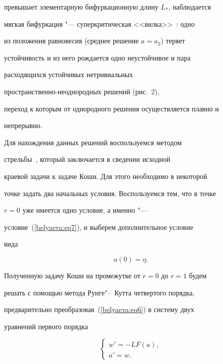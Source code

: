 превышает элементарную бифуркационную длину $L_*$, наблюдается

мягкая бифуркация "--- суперкритическая <<вилка>>~\cite{Bif}: одно

из положения равновесия (среднее решение $a=a_2$) теряет

устойчивость и из него рождается одно неустойчивое и пара

расходящихся устойчивых нетривиальных

про\-стран\-ствен\-но-не\-од\-но\-род\-ных решений (рис.~2),

переход к которым от однородного решения осуществляется плавно и

непрерывно.





Для нахождения данных решений воспользуемся методом

стрельбы~\cite{Hol}, который заключается в сведении исходной

краевой задачи к задаче Коши. Для этого необходимо в некоторой

точке задать два начальных условия. Воспользуемся тем, что в точке

$r=0$ уже имеется одно условие, а именно "---

условие~(\ref{belyaeva:eq7}), и выберем дополнительное условие

вида

\begin{equation} \label{belyaeva:eq13}

a(0)=\eta.

\end{equation}

Полученную задачу Коши на промежутке от $r=0$ до $r=1$ будем

решать с помощью метода Рунге"--~Кутта четвертого порядка,

предварительно преобразовав~(\ref{belyaeva:eq6}) в систему двух

уравнений первого порядка

\begin{equation*}

\begin{cases}

w'=-LF(a),\\

a'=w.

\end{cases}

\end{equation*}

